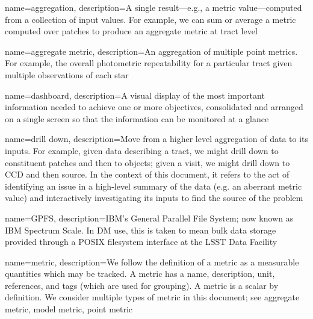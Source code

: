 %
%


%
%

{
  name={aggregation},
  description={A single result---e.g., a \gls{metric value}---computed from a
  collection of input values. For example, we can sum or average a
  \gls{metric} computed over patches to produce an \gls{aggregate metric} at
  tract level}
}

{
  name={aggregate metric},
  description={An \gls{aggregation} of multiple \glspl{point metric}. For
  example, the overall photometric repeatability for a particular tract given
  multiple observations of each star}
}

{
  name={dashboard},
  description={A visual display of the most important information needed to
  achieve one or more objectives, consolidated and arranged on a single screen
  so that the information can be monitored at a glance \citep{Few:2013}}
}

{
  name={drill down},
  description={Move from a higher level aggregation of data to its inputs. For
  example, given data describing a tract, we might drill down to constituent
  patches and then to objects; given a visit, we might drill down to CCD and
  then source. In the context of this document, it refers to the act of
  identifying an issue in a high-level summary of the data (e.g. an aberrant
  \gls{metric value}) and interactively investigating its inputs to find the
  source of the problem}
}

{
  name={GPFS},
  description={IBM's General Parallel File System; now known as IBM Spectrum
  Scale. In DM use, this is taken to mean bulk data storage provided through a
  POSIX filesystem interface at the LSST Data Facility}
}

{
  name={metric},
  description={We follow the  definition of a metric as a
  measurable quantities which may be tracked. A metric has a name,
  description, unit, references, and tags (which are used for grouping). A
  metric is a scalar by definition. We consider multiple types of metric in
  this document; see \gls{aggregate metric}, \gls{model metric}, \gls{point
  metric}}
}


